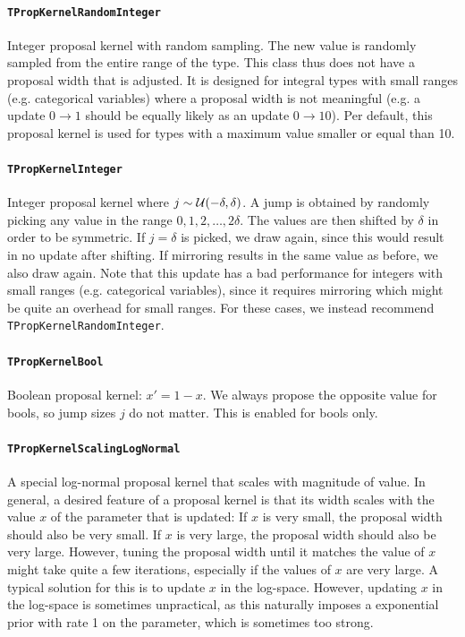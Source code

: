 \documentclass[a4paper,11pt]{article}
\newcommand{\class}[1]{\texttt{#1}}
\begin{document}
\paragraph{\class{TPropKernelRandomInteger}}
Integer proposal kernel with random sampling. The new value is randomly sampled from the entire range of the type. This class thus does not have a proposal width that is adjusted. It is designed for integral types with small ranges (e.g. categorical variables) where a proposal width is not meaningful (e.g. a update $0 \to 1$ should be equally likely as an update $0 \to 10$). Per default, this proposal kernel is used for types with a maximum value smaller or equal than 10.

\paragraph{\class{TPropKernelInteger}}
Integer proposal kernel where $j \sim {\cal U}(-\delta, \delta)$. A jump is obtained by randomly picking any value in the range $0, 1, 2, \ldots, 2\delta$. The values are then shifted by $\delta$ in order to be symmetric. If $j=\delta$ is picked, we draw again, since this would result in no update after shifting. If mirroring results in the same value as before, we also draw again. Note that this update has a bad performance for integers with small ranges (e.g. categorical variables), since it requires mirroring which might be quite an overhead for small ranges. For these cases, we instead recommend \class{TPropKernelRandomInteger}.

\paragraph{\class{TPropKernelBool}}
Boolean proposal kernel: $x' = 1-x$. We always propose the opposite value for bools, so jump sizes $j$ do not matter. This is enabled for bools only.

\paragraph{\class{TPropKernelScalingLogNormal}}
A special log-normal proposal kernel that scales with magnitude of value. In general, a desired feature of a proposal kernel is that its width scales with the value $x$ of the parameter that is updated: If $x$ is very small, the proposal width should also be very small. If $x$ is very large, the proposal width should also be very large. However, tuning the proposal width until it matches the value of $x$ might take quite a few iterations, especially if the values of $x$ are very large. A typical solution for this is to update $x$ in the log-space. However, updating $x$ in the log-space is sometimes unpractical, as this naturally imposes a exponential prior with rate 1 on the parameter, which is sometimes too strong.
\end{document}
